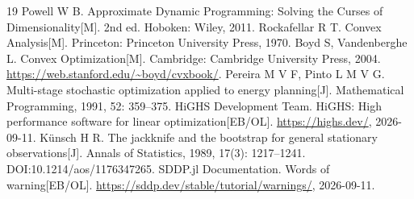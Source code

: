 \documentclass[UTF8,a4paper,zihao=-4,fontset=mac]{ctexart}
\begin{document}
{\begin{thebibliography}{19}
 Powell W B. Approximate Dynamic Programming: Solving the Curses of Dimensionality[M]. 2nd ed. Hoboken: Wiley, 2011.
 Rockafellar R T. Convex Analysis[M]. Princeton: Princeton University Press, 1970.
 Boyd S, Vandenberghe L. Convex Optimization[M]. Cambridge: Cambridge University Press, 2004. \url{https://web.stanford.edu/~boyd/cvxbook/}.
 Pereira M V F, Pinto L M V G. Multi-stage stochastic optimization applied to energy planning[J]. Mathematical Programming, 1991, 52: 359--375.
 HiGHS Development Team. HiGHS: High performance software for linear optimization[EB/OL]. \url{https://highs.dev/}, 2026-09-11.
 Künsch H R. The jackknife and the bootstrap for general stationary observations[J]. Annals of Statistics, 1989, 17(3): 1217--1241. DOI:10.1214/aos/1176347265.
 SDDP.jl Documentation. Words of warning[EB/OL]. \url{https://sddp.dev/stable/tutorial/warnings/}, 2026-09-11.
\end{thebibliography}
}
\label{bodyend}
\clearpage
\appendix

\end{document}
